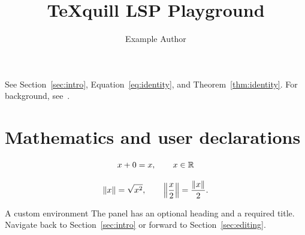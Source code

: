 \documentclass[11pt]{article}
\title{TeXquill LSP Playground}
\author{Example Author}
\date{}
\begin{document}
\maketitle
\tableofcontents

See Section~\ref{sec:intro}, Equation~\eqref{eq:identity}, and
Theorem~\ref{thm:identity}. For background, see~\cite{knuth1984,lamport1994}.



\section{Mathematics and user declarations}
\label{sec:math}


\begin{equation}
  x + 0 = x, \qquad x \in \R
  \label{eq:identity}
\end{equation}

\[
  \norm{x} = \sqrt{x^2}, \qquad
  \norm*{\frac{x}{2}} = \frac{\norm{x}}{2}.
\]

\begin{demopanel}[Example]{A custom environment}
  The panel has an optional heading and a required title.
  Navigate back to Section~\ref{sec:intro} or forward to Section~\ref{sec:editing}.
\end{demopanel}
\end{document}
